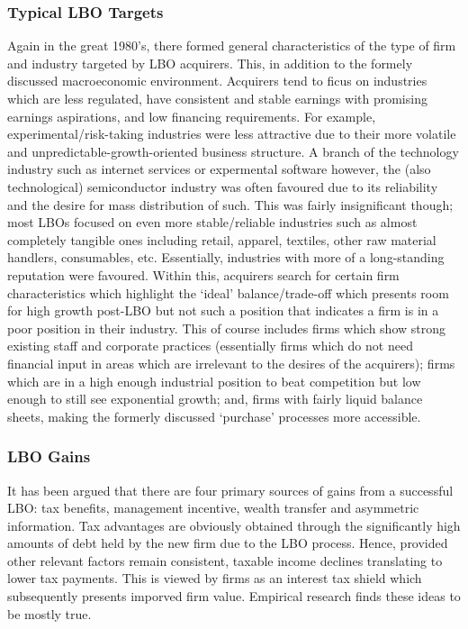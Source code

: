 \documentclass[11pt, english]{article}
\begin{document}
		\subsubsection*{Typical LBO Targets}
	
	Again in the great 1980's, there formed general characteristics of the type of firm and industry targeted by LBO acquirers. This, in addition to the formely discussed macroeconomic environment. Acquirers tend to ficus on industries which are less regulated, have consistent and stable earnings with promising earnings aspirations, and low financing requirements. For example, experimental/risk-taking industries were less attractive due to their more volatile and unpredictable-growth-oriented business structure. A branch of the technology industry such as internet services or expermental software however, the (also technological) semiconductor industry was often favoured due to its reliability and the desire for mass distribution of such. This was fairly insignificant though; most LBOs focused on even more stable/reliable industries such as almost completely tangible ones including retail, apparel, textiles, other raw material handlers, consumables, etc. Essentially, industries with more of a long-standing reputation were favoured. Within this, acquirers search for certain firm characteristics which highlight the `ideal' balance/trade-off which presents room for high growth post-LBO but not such a position that indicates a firm is in a poor position in their industry. This of course includes firms which show strong existing staff and corporate practices (essentially firms which do not need financial input in areas which are irrelevant to the desires of the acquirers); firms which are in a high enough industrial position to beat competition but low enough to still see exponential growth; and, firms with fairly liquid balance sheets, making the formerly discussed `purchase' processes more accessible.

		\subsubsection*{LBO Gains}

	It has been argued that there are four primary sources of gains from a successful LBO: tax benefits, management incentive, wealth transfer and asymmetric information. Tax advantages are obviously obtained through the significantly high amounts of debt held by the new firm due to the LBO process. Hence, provided other relevant factors remain consistent, taxable income declines translating to lower tax payments. This is viewed by firms as an interest tax shield which subsequently presents imporved firm value. Empirical research finds these ideas to be mostly true.\\
\end{document}
